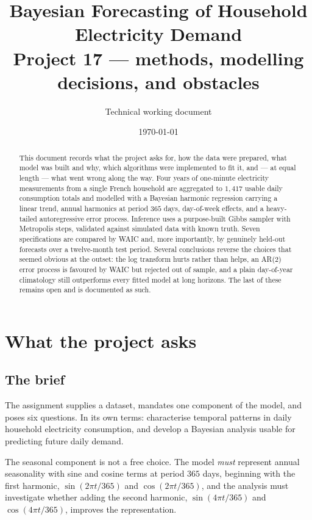 \documentclass[11pt]{article}
\title{\vspace{-1.2cm}\textbf{Bayesian Forecasting of Household Electricity Demand}\\[2pt]
\large Project 17 --- methods, modelling decisions, and obstacles}
\author{Technical working document}
\date{\today}
\begin{document}
\maketitle
\thispagestyle{fancy}

\begin{abstract}
\noindent
This document records what the project asks for, how the data were prepared, what
model was built and why, which algorithms were implemented to fit it, and --- at
equal length --- what went wrong along the way. Four years of one-minute
electricity measurements from a single French household are aggregated to
$1{,}417$ usable daily consumption totals and modelled with a Bayesian harmonic
regression carrying a linear trend, annual harmonics at period $365$ days,
day-of-week effects, and a heavy-tailed autoregressive error process. Inference
uses a purpose-built Gibbs sampler with Metropolis steps, validated against
simulated data with known truth. Seven specifications are compared by WAIC and,
more importantly, by genuinely held-out forecasts over a twelve-month test
period. Several conclusions reverse the choices that seemed obvious at the
outset: the log transform hurts rather than helps, an AR(2) error process is
favoured by WAIC but rejected out of sample, and a plain day-of-year
climatology still outperforms every fitted model at long horizons. The last of
these remains open and is documented as such.
\end{abstract}

\section{What the project asks}

\subsection{The brief}

The assignment supplies a dataset, mandates one component of the model, and
poses six questions. In its own terms: characterise temporal patterns in daily
household electricity consumption, and develop a Bayesian analysis usable for
predicting future daily demand.

The seasonal component is not a free choice. The model \emph{must} represent
annual seasonality with sine and cosine terms at period $365$ days, beginning
with the first harmonic, $\sin(2\pi t/365)$ and $\cos(2\pi t/365)$, and the
analysis must investigate whether adding the second harmonic,
$\sin(4\pi t/365)$ and $\cos(4\pi t/365)$, improves the representation.
\end{document}

